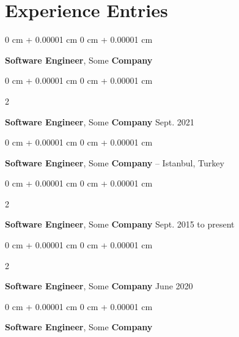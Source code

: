 \documentclass[10pt, letterpaper]{article}
\newenvironment{onecolentry}{
    \begin{adjustwidth}{
        0 cm + 0.00001 cm
    }{
        0 cm + 0.00001 cm
    }
}{
    \end{adjustwidth}
} %
\newenvironment{twocolentry}[2][]{
    \onecolentry
    \def\secondColumn{#2}
    \setcolumnwidth{\fill, 4.5 cm}
    \begin{paracol}{2}
}{
    \switchcolumn \raggedleft \secondColumn
    \end{paracol}
    \endonecolentry
} %
\begin{document}
    
    \section{Experience Entries}



        
        \begin{onecolentry}
            \textbf{Software Engineer}, Some \textbf{Company}\end{onecolentry}



        \vspace{0.2 cm}

        \begin{twocolentry}{
            Sept. 2021
        }
            \textbf{Software Engineer}, Some \textbf{Company}\end{twocolentry}



        \vspace{0.2 cm}

        \begin{onecolentry}
            \textbf{Software Engineer}, Some \textbf{Company} -- Istanbul, Turkey\end{onecolentry}



        \vspace{0.2 cm}

        \begin{twocolentry}{
            Sept. 2015 to present
        }
            \textbf{Software Engineer}, Some \textbf{Company}\end{twocolentry}



        \vspace{0.2 cm}

        \begin{twocolentry}{
            June 2020
        }
            \textbf{Software Engineer}, Some \textbf{Company}\end{twocolentry}



        \vspace{0.2 cm}

        \begin{onecolentry}
            \textbf{Software Engineer}, Some \textbf{Company}\end{onecolentry}
\end{document}
